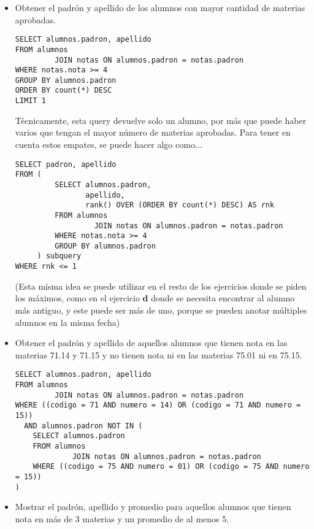 \documentclass[12pt, a4paper]{article}
\begin{document}

\setcounter{page}{1}

\begin{itemize}
\item Obtener el padrón y apellido de los alumnos con mayor cantidad de materias aprobadas.
\begin{lstlisting}[frame=single]
SELECT alumnos.padron, apellido
FROM alumnos
         JOIN notas ON alumnos.padron = notas.padron
WHERE notas.nota >= 4
GROUP BY alumnos.padron
ORDER BY count(*) DESC
LIMIT 1
\end{lstlisting}

Técnicamente, esta query devuelve solo un alumno, por más que puede haber varios que tengan el mayor número de materias aprobadas. Para tener en cuenta estos empates, se puede hacer algo como...

\begin{lstlisting}[frame=single]
SELECT padron, apellido
FROM (
         SELECT alumnos.padron,
                apellido,
                rank() OVER (ORDER BY count(*) DESC) AS rnk
         FROM alumnos
                  JOIN notas ON alumnos.padron = notas.padron
         WHERE notas.nota >= 4
         GROUP BY alumnos.padron
     ) subquery
WHERE rnk <= 1
\end{lstlisting}

\small (Esta mísma idea se puede utilizar en el resto de los ejercicios donde se piden los máximos, como en el ejercicio \textbf{d} donde se necesita encontrar al alumno más antiguo, y este puede ser más de uno, porque se pueden anotar múltiples alumnos en la misma fecha)

\item Obtener el padrón y apellido de aquellos alumnos que tienen nota en las materias 71.14 y 71.15 y no tienen nota ni en las materias 75.01 ni en 75.15.

\begin{lstlisting}[frame=single]
SELECT alumnos.padron, apellido
FROM alumnos
         JOIN notas ON alumnos.padron = notas.padron
WHERE ((codigo = 71 AND numero = 14) OR (codigo = 71 AND numero = 15))
  AND alumnos.padron NOT IN (
    SELECT alumnos.padron
    FROM alumnos
             JOIN notas ON alumnos.padron = notas.padron
    WHERE ((codigo = 75 AND numero = 01) OR (codigo = 75 AND numero = 15))
)
\end{lstlisting}

\item Mostrar el padrón, apellido y promedio para aquellos alumnos que tienen nota en más de 3 materias y un promedio de al menos 5.


\end{itemize}
\end{document}
